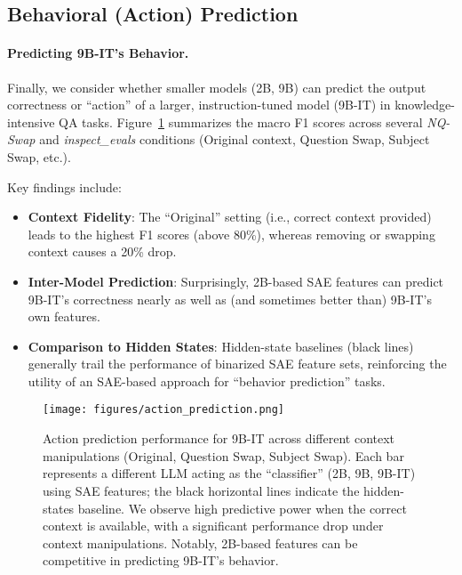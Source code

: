 \subsection{Behavioral (Action) Prediction}
\label{sec:behavioral_results}

\paragraph{Predicting 9B-IT’s Behavior.}
Finally, we consider whether smaller models (2B, 9B) can predict the output correctness or “action” of a larger, instruction-tuned model (9B-IT) in knowledge-intensive QA tasks. Figure~\ref{fig:action} summarizes the macro F1 scores across several \emph{NQ-Swap} and \emph{inspect\_evals} conditions (Original context, Question Swap, Subject Swap, etc.).

Key findings include:
\begin{itemize}
    \item \textbf{Context Fidelity}: The “Original” setting (i.e., correct context provided) leads to the highest F1 scores (above 80\%), whereas removing or swapping context causes a 20\% drop.
    \item \textbf{Inter-Model Prediction}: Surprisingly, 2B-based SAE features can predict 9B-IT’s correctness nearly as well as (and sometimes better than) 9B-IT’s own features. 
    \item \textbf{Comparison to Hidden States}: Hidden-state baselines (black lines) generally trail the performance of binarized SAE feature sets, reinforcing the utility of an SAE-based approach for “behavior prediction” tasks.
\end{itemize}

\begin{figure}[t]
    \centering
    \texttt{[image: figures/action\_prediction.png]}
    \caption{Action prediction performance for 9B-IT across different context manipulations (Original, Question Swap, Subject Swap). Each bar represents a different LLM acting as the “classifier” (2B, 9B, 9B-IT) using SAE features; the black horizontal lines indicate the hidden-states baseline. We observe high predictive power when the correct context is available, with a significant performance drop under context manipulations. Notably, 2B-based features can be competitive in predicting 9B-IT’s behavior.} 
    \label{fig:action}
\end{figure}
 
